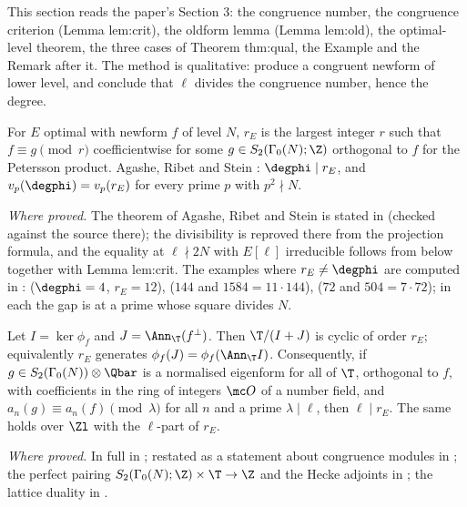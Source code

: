 \begin{sloppypar}
This section reads the paper's Section 3: the congruence number, the congruence criterion (Lemma lem:crit), the oldform lemma (Lemma lem:old), the
optimal-level theorem, the three cases of Theorem thm:qual, the Example and the Remark after it. The method is qualitative: produce a congruent newform
of lower level, and conclude that $\ell$ divides the congruence number, hence the degree.

\begin{definition}\label{def:paper:congruence-number}
For $E$ optimal with newform $f$ of level $N$, $r_E$ is the largest integer $r$ such that $f\equiv g\pmod r$ coefficientwise for some $g\in S_2(\Gamma_0(N);\Z)$ orthogonal to $f$ for
the Petersson product. Agashe, Ribet and Stein \cite[Theorem 2.2]{ARS12}: $\degphi\mid r_E$, and $v_p(\degphi)=v_p(r_E)$ for every prime $p$ with $p^2\nmid N$.
\end{definition}

\noindent\emph{Where proved.} The theorem of Agashe, Ribet and Stein is stated in  (checked against the source there); the divisibility is reproved
there from the projection formula, and the equality at $\ell\nmid2N$ with $E[\ell]$ irreducible follows from  below together with Lemma lem:crit.
The examples where $r_E\ne\degphi$ are computed in :  ($\degphi=4$, $r_E=12$),  ($144$ and $1584=11\cdot144$),  ($72$ and
$504=7\cdot72$); in each the gap is at a prime whose square divides $N$.

\begin{lemma}\label{lem:paper:crit}
Let $I=\ker\phi_f$ and $J=\Ann_{\T}(f^\perp)$. Then $\T/(I+J)$ is cyclic of order $r_E$; equivalently $r_E$ generates $\phi_f(J)=\phi_f(\Ann_\T I)$. Consequently, if $g\in S_2(\Gamma_0(N))\otimes\Qbar$
is a normalised eigenform for all of $\T$, orthogonal to $f$, with coefficients in the ring of integers $\mc O$ of a number field, and $a_n(g)\equiv a_n(f)\pmod\lambda$ for all $n$ and a prime
$\lambda\mid\ell$, then $\ell\mid r_E$. The same holds over $\Zl$ with the $\ell$-part of $r_E$.
\end{lemma}

\noindent\emph{Where proved.} In full in ; restated as a statement about congruence modules in ; the perfect pairing
$S_2(\Gamma_0(N);\Z)\times\T\to\Z$ and the Hecke adjoints in ; the lattice duality in .


\end{sloppypar}
